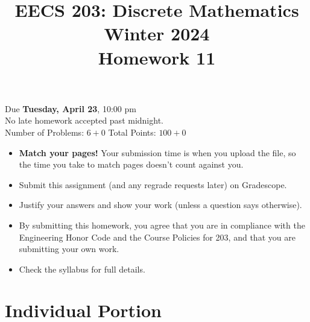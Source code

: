 \documentclass[12pt]{exam}
\newcommand{\hwnum}{11}
\begin{document}
\title{EECS 203: Discrete Mathematics\\
  Winter 2024\\
  Homework \hwnum{}}
\date{}
\author{}
\maketitle
\vspace{-50pt}
\begin{center}
  \huge Due \textbf{Tuesday, April 23}, 10:00 pm\\
\Large No late homework accepted past midnight.\\
\vspace{10pt}
\large Number of Problems: $6+0$
\hspace{3cm}
Total Points: $100+0$
\end{center}
\vspace{25pt}
\begin{itemize}
    \item \textbf{Match your pages!} Your submission time is when you upload the file, so the time you take to match pages doesn't count against you.
    \item Submit this assignment (and any regrade requests later) on Gradescope. 
    \item Justify your answers and show your work (unless a question says otherwise).
    \item By submitting this homework, you agree that you are in compliance with the Engineering Honor Code and the Course Policies for 203, and that you are submitting your own work.
    \item Check the syllabus for full details.
\end{itemize}
\newpage

\section*{Individual Portion}
\end{document}
